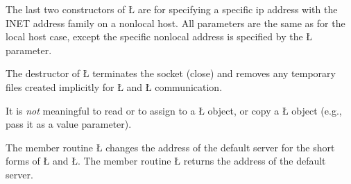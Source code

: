 \documentclass[openright,twoside]{report}
\begin{document}
The last two constructors of \LGinlinetrue\LGbegin\lgrinde\L{}\endlgrinde\LGend{} are for specifying a specific ip address with the INET address family on a nonlocal host.
All parameters are the same as for the local host case, except the specific nonlocal address is specified by the \LGinlinetrue\LGbegin\lgrinde\L{}\endlgrinde\LGend{} parameter.

The destructor of \LGinlinetrue\LGbegin\lgrinde\L{}\endlgrinde\LGend{} terminates the socket (close) and removes any temporary files created implicitly for \LGinlinetrue\LGbegin\lgrinde\L{}\endlgrinde\LGend{} and \LGinlinetrue\LGbegin\lgrinde\L{}\endlgrinde\LGend{} communication.

It is \emph{not} meaningful to read or to assign to a \LGinlinetrue\LGbegin\lgrinde\L{}\endlgrinde\LGend{} object, or copy a \LGinlinetrue\LGbegin\lgrinde\L{}\endlgrinde\LGend{} object (e.g., pass it as a value parameter).

The member routine \LGinlinetrue\LGbegin\lgrinde\L{}\endlgrinde\LGend{} changes the address of the default server for the short forms of \LGinlinetrue\LGbegin\lgrinde\L{}\endlgrinde\LGend{} and \LGinlinetrue\LGbegin\lgrinde\L{}\endlgrinde\LGend{}.
The member routine \LGinlinetrue\LGbegin\lgrinde\L{}\endlgrinde\LGend{} returns the address of the default server.
\end{document}
